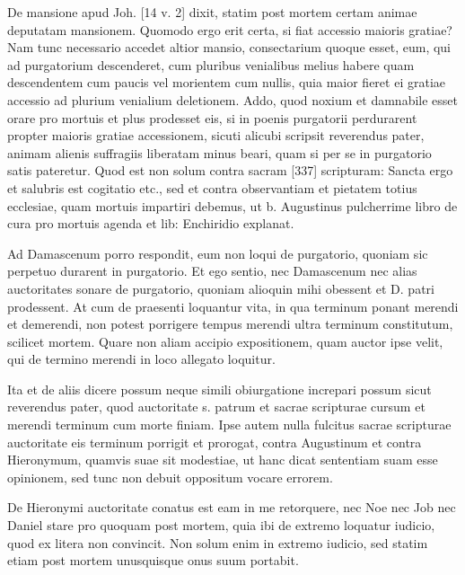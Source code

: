 De mansione apud Joh. [14 v. 2] dixit, statim post mortem certam animae deputatam mansionem. Quomodo ergo erit certa, si fiat accessio maioris gratiae? Nam tunc necessario accedet altior mansio, consectarium quoque esset, eum, qui ad purgatorium descenderet, cum pluribus venialibus melius habere quam descendentem cum paucis vel morientem cum nullis, quia maior fieret ei gratiae accessio ad plurium venialium deletionem. Addo, quod noxium et damnabile esset orare pro mortuis et plus prodesset eis, si in poenis purgatorii perdurarent propter maioris gratiae accessionem, sicuti alicubi scripsit reverendus pater, animam alienis suffragiis liberatam minus beari, quam si per se in purgatorio satis pateretur. Quod est non solum contra sacram [337] scripturam: Sancta ergo et salubris est cogitatio etc., sed et contra observantiam et pietatem totius ecclesiae, quam mortuis impartiri debemus, ut b. Augustinus pulcherrime libro de cura pro mortuis agenda et lib: Enchiridio explanat.

Ad Damascenum porro respondit, eum non loqui de purgatorio, quoniam sic perpetuo durarent in purgatorio. Et ego sentio, nec Damascenum nec alias auctoritates sonare de purgatorio, quoniam alioquin mihi obessent et D. patri prodessent. At cum de praesenti loquantur vita, in qua terminum ponant merendi et demerendi, non potest porrigere tempus merendi ultra terminum constitutum, scilicet mortem. Quare non aliam accipio expositionem, quam auctor ipse velit, qui de termino merendi in loco allegato loquitur.

Ita et de aliis dicere possum neque simili obiurgatione increpari possum sicut reverendus pater, quod auctoritate s. patrum et sacrae scripturae cursum et merendi terminum cum morte finiam. Ipse autem nulla fulcitus sacrae scripturae auctoritate eis terminum porrigit et prorogat, contra Augustinum et contra Hieronymum, quamvis suae sit modestiae, ut hanc dicat sententiam suam esse opinionem, sed tunc non debuit oppositum vocare errorem.

De Hieronymi auctoritate conatus est eam in me retorquere, nec Noe nec Job nec Daniel stare pro quoquam post mortem, quia ibi de extremo loquatur iudicio, quod ex litera non convincit. Non solum enim in extremo iudicio, sed statim etiam post mortem unusquisque onus suum portabit.

